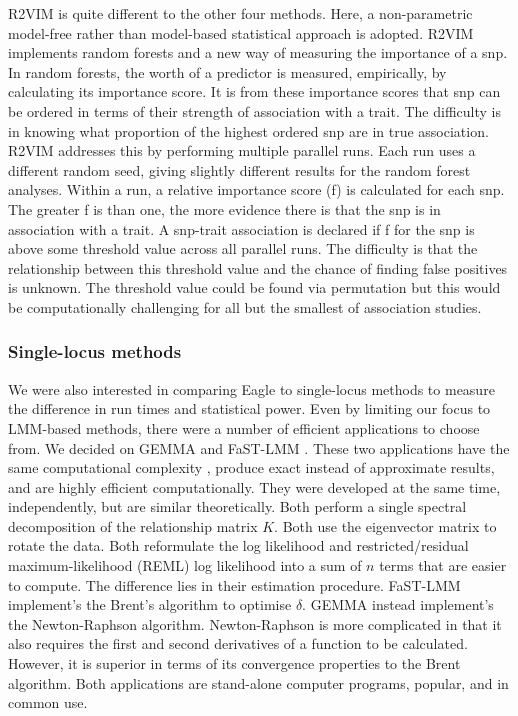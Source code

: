 \documentclass{article}
\begin{document}
R2VIM is quite different to the other four methods. Here, a non-parametric model-free rather than model-based statistical approach is adopted. 
R2VIM implements random forests and a new way of measuring the importance of a snp.  
In random forests, the worth of a predictor is measured, empirically, by calculating its importance score. 
It is from these importance scores that snp can be ordered in terms of their strength of association with a trait. 
The difficulty is in knowing what proportion of the 
highest ordered snp are in true association. R2VIM addresses this by performing multiple parallel runs. Each run uses a different 
random seed, giving slightly different results for the random forest analyses. Within a run, a relative importance score (f) is calculated for 
each snp. The greater f is than one, the more evidence there is that the snp is in association with a trait.  A snp-trait association is 
declared if f for the snp is above some threshold value across all parallel runs. The difficulty is that the relationship between 
this threshold value and the chance of finding false positives is unknown.  The threshold value could be found via permutation but 
this would be computationally challenging for all but the smallest of association studies. 


\subsubsection{Single-locus methods}

We were also interested in comparing Eagle to single-locus methods to measure the difference in run times and statistical power. Even by limiting our focus to LMM-based methods, there were a number of efficient applications to choose from. 
We decided on GEMMA \cite{zhou2012genome} and FaST-LMM \cite{lippert2011fast}. These two applications have the same computational complexity \cite{zhou2012genome}, produce exact instead of approximate results, and are highly efficient computationally. They were developed at the same time, independently, but are similar theoretically. Both perform a single spectral decomposition of the relationship matrix $K$. Both use the eigenvector matrix to rotate the data. Both reformulate the log likelihood and 
restricted/residual maximum-likelihood (REML) 
log likelihood into a sum of $n$ terms that are easier to compute. The difference lies in their estimation procedure. FaST-LMM implement's the Brent's algorithm to optimise $\delta$. GEMMA instead implement's the Newton-Raphson algorithm. Newton-Raphson is more complicated in that it also requires the first and second derivatives of a function to be calculated. However, it is superior in terms of its convergence properties to the Brent algorithm.  Both applications are stand-alone computer programs, popular, and in common use.
\end{document}
